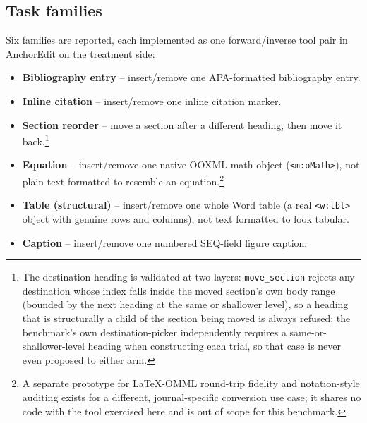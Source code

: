 \documentclass[11pt]{article}
\DeclareRobustCommand{\claim}[2]{#2}
\begin{document}
\subsection{Task families}
\claim{six-task-families}{Six families are reported, each implemented as one forward/inverse tool pair in AnchorEdit on
the treatment side:}
\begin{itemize}
\item \textbf{Bibliography entry} -- insert/remove one APA-formatted bibliography entry.
\item \textbf{Inline citation} -- insert/remove one inline citation marker.
\item \textbf{Section reorder} -- move a section after a different heading, then move it
  back.\footnote{\claim{section-reorder-destination-validation}{The destination heading is validated at two layers: \texttt{move\_section}
  rejects any destination whose index falls inside the moved section's own body range (bounded by
  the next heading at the same or shallower level), so a heading that is structurally a child of
  the section being moved is always refused; the benchmark's own destination-picker independently
  requires a same-or-shallower-level heading when constructing each trial, so that case is never
  even proposed to either arm.}}
\item \textbf{Equation} -- \claim{native-ooxml-structures}{insert/remove one native OOXML math object (\texttt{<m:oMath>}), not
  plain text formatted to resemble an equation.}\footnote{A separate prototype for
  LaTeX-OMML round-trip fidelity and notation-style auditing exists for a different,
  journal-specific conversion use case; it shares no code with the tool exercised here and is out
  of scope for this benchmark.}
\item \textbf{Table (structural)} -- \claim{native-ooxml-structures}{insert/remove one whole Word table (a real
  \texttt{<w:tbl>} object with genuine rows and columns), not text formatted to look tabular.}
\item \textbf{Caption} -- \claim{native-ooxml-structures}{insert/remove one numbered SEQ-field figure caption.}
\end{itemize}
\end{document}
